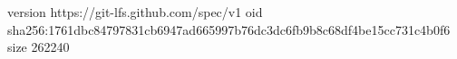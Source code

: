 version https://git-lfs.github.com/spec/v1
oid sha256:1761dbc84797831cb6947ad665997b76dc3dc6fb9b8c68df4be15cc731c4b0f6
size 262240
